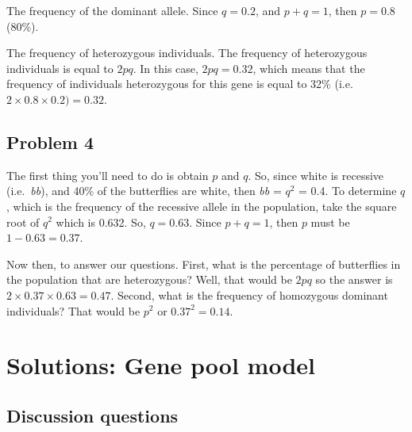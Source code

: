 \documentclass[
  a4paper]{book}
\begin{document}
The frequency of the dominant allele. Since \(q = 0.2\), and \(p + q = 1\), then \(p = 0.8\) (80\%).

The frequency of heterozygous individuals. The frequency of heterozygous individuals is equal to \(2pq\). In this case, \(2pq = 0.32\), which means that the frequency of individuals heterozygous for this gene is equal to 32\% (i.e.~\(2 \times 0.8 \times 0.2) = 0.32\).

\subsection{Problem 4}\label{problem-4}

The first thing you'll need to do is obtain \(p\) and \(q\). So, since white is recessive (i.e.~\emph{bb}), and 40\% of the butterflies are white, then \emph{bb} = \(q^2\) = 0.4.
To determine \(q\), which is the frequency of the recessive allele in the population, take the square root of \(q^2\) which is 0.632. So, \(q = 0.63\). Since \(p + q = 1\), then \(p\) must be \(1 - 0.63 = 0.37\).

Now then, to answer our questions. First, what is the percentage of butterflies in the population that are heterozygous? Well, that would be \(2pq\) so the answer is \(2 \times 0.37\times 0.63 = 0.47\). Second, what is the frequency of homozygous dominant individuals? That would be \(p^2\) or \(0.37^2 = 0.14\).

\section{Solutions: Gene pool model}\label{solutions-gene-pool-model}

\subsection{Discussion questions}\label{discussion-questions}
\end{document}
